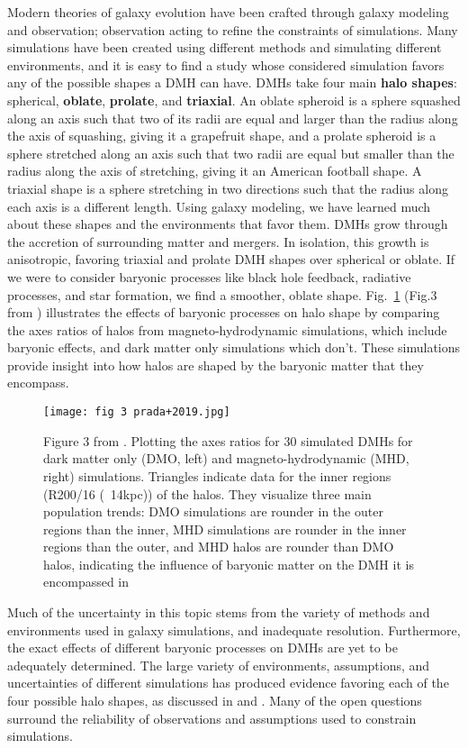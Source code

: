 \documentclass[fleqn,usenatbib]{mnras}
\begin{document}
Modern theories of galaxy evolution have been crafted through galaxy modeling and observation; observation acting to refine the constraints of simulations. Many simulations have been created using different methods and simulating different environments, and it is easy to find a study whose considered simulation favors any of the possible shapes a DMH can have. DMHs take four main \textbf{halo shapes}: spherical, \textbf{oblate}, \textbf{prolate}, and \textbf{triaxial}. An oblate spheroid is a sphere squashed along an axis such that two of its radii are equal and larger than the radius along the axis of squashing, giving it a grapefruit shape, and a prolate spheroid is a sphere stretched along an axis such that two radii are equal but smaller than the radius along the axis of stretching, giving it an American football shape. A triaxial shape is a sphere stretching in two directions such that the radius along each axis is a different length. Using galaxy modeling, we have learned much about these shapes and the environments that favor them. DMHs grow through the accretion of surrounding matter and mergers.  In isolation, this growth is anisotropic, favoring triaxial and prolate DMH shapes over spherical or oblate. If we were to consider baryonic processes like black hole feedback, radiative processes, and star formation, we find a smoother, oblate shape. Fig.~\ref{fig:MHD vs DMO} (Fig.3 from \citet{Prada_2019}) illustrates the effects of baryonic processes on halo shape by comparing the axes ratios of halos from magneto-hydrodynamic simulations, which include baryonic effects, and dark matter only simulations which don't. These simulations provide insight into how halos are shaped by the baryonic matter that they encompass.


\begin{figure}
	\texttt{[image: fig 3 prada+2019.jpg]}
    \caption{Figure 3 from \citet{Prada_2019}. Plotting the axes ratios for 30 simulated DMHs for dark matter only (DMO, left) and magneto-hydrodynamic (MHD, right) simulations. Triangles indicate data for the inner regions (R200/16 (~14kpc)) of the halos. They visualize three main population trends: DMO simulations are rounder in the outer regions than the inner, MHD simulations are rounder in the inner regions than the outer, and MHD halos are rounder than DMO halos, indicating the influence of baryonic matter on the DMH it is encompassed in}
    \label{fig:MHD vs DMO}
\end{figure}

Much of the uncertainty in this topic stems from the variety of methods and environments used in galaxy simulations, and inadequate resolution. Furthermore, the exact effects of different baryonic processes on DMHs are yet to be adequately determined. The large variety of environments, assumptions, and uncertainties of different simulations has produced evidence favoring each of the four possible halo shapes, as discussed in \citet{Chua_2019} and \citet{Prada_2019}. Many of the open questions surround the reliability of observations and assumptions used to constrain simulations.
\end{document}
